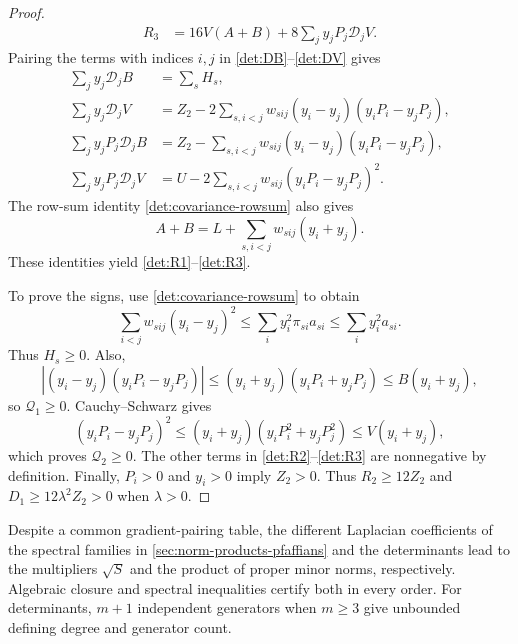 \begin{proof}
\begin{align*}
 R_3&=16V(A+B)+8\sum_jy_jP_j\mathscr D_jV.
\end{align*}
Pairing the terms with indices $i,j$ in
\eqref{det:DB}--\eqref{det:DV} gives
\begin{align*}
 \sum_jy_j\mathscr D_jB&=\sum_sH_s,\\
 \sum_jy_j\mathscr D_jV
 &=Z_2-2\sum_{s,i<j}w_{sij}(y_i-y_j)(y_iP_i-y_jP_j),\\
 \sum_jy_jP_j\mathscr D_jB
 &=Z_2-\sum_{s,i<j}w_{sij}(y_i-y_j)(y_iP_i-y_jP_j),\\
 \sum_jy_jP_j\mathscr D_jV
 &=U-2\sum_{s,i<j}w_{sij}(y_iP_i-y_jP_j)^2.
\end{align*}
The row-sum identity \eqref{det:covariance-rowsum} also gives
\begin{equation}\label{det:AplusB}
 A+B=L+\sum_{s,i<j}w_{sij}(y_i+y_j).
\end{equation}
These identities yield \eqref{det:R1}--\eqref{det:R3}.

To prove the signs, use \eqref{det:covariance-rowsum} to obtain
\[
 \sum_{i<j}w_{sij}(y_i-y_j)^2
 \leq\sum_i y_i^2\pi_{si}a_{si}
 \leq\sum_i y_i^2a_{si}.
\]
Thus $H_s\geq0$.  Also,
\[
 |(y_i-y_j)(y_iP_i-y_jP_j)|
 \leq(y_i+y_j)(y_iP_i+y_jP_j)
 \leq B(y_i+y_j),
\]
so $\mathcal Q_1\geq0$.  Cauchy--Schwarz gives
\[
 (y_iP_i-y_jP_j)^2
 \leq(y_i+y_j)(y_iP_i^2+y_jP_j^2)
 \leq V(y_i+y_j),
\]
which proves $\mathcal Q_2\geq0$.  The other terms in
\eqref{det:R2}--\eqref{det:R3} are nonnegative by definition.
Finally, $P_i>0$ and $y_i>0$ imply $Z_2>0$.
Thus $R_2\geq12Z_2$ and $D_1\geq12\lambda^2Z_2>0$ when $\lambda>0$.
\end{proof}

Despite a common gradient-pairing table, the different Laplacian
coefficients of the spectral families in
\cref{sec:norm-products-pfaffians} and the determinants
lead to the multipliers $\sqrt S$ and the product of proper minor norms,
respectively. Algebraic closure and spectral inequalities certify both
in every order. For determinants, $m+1$ independent generators when
$m\ge3$ give unbounded defining degree and generator count.
